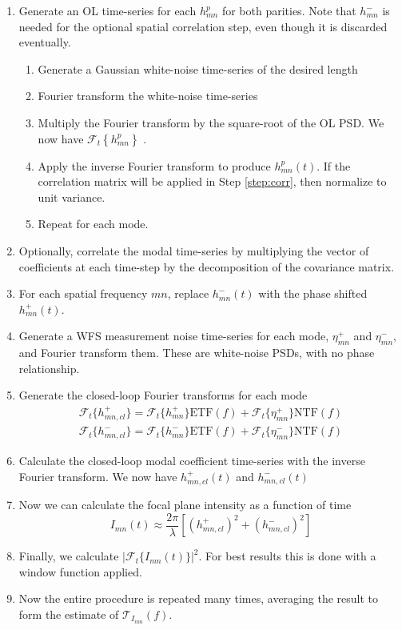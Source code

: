 \documentclass[10pt,preprint]{aastex631}
\begin{document}
\begin{enumerate}
\item Generate an OL time-series for each $h_{mn}^p$ for both parities.  Note that $h_{mn}^-$ is needed for the optional spatial correlation step, even though it is discarded eventually. \label{step:olh}
\begin{enumerate}
\item Generate a Gaussian white-noise time-series of the desired length
\item Fourier transform the white-noise time-series
\item Multiply the Fourier transform by the square-root of the OL PSD.  We now have $\mathcal{F}_t\left\{h_{mn}^p\right\}$ \citep[cf.][]{kasdin_falpha}.
\item Apply the inverse Fourier transform to produce $h_{mn}^p(t)$.  If the correlation matrix will be applied in Step \ref{step:corr}, then normalize to unit variance.
\item Repeat for each mode.
\end{enumerate}
\item Optionally, correlate the modal time-series by multiplying the vector of coefficients at each time-step by the decomposition of the covariance matrix. \label{step:corr}
\item For each spatial frequency $mn$, replace $h_{mn}^-(t)$ with the phase shifted $h_{mn}^+(t)$.
\item Generate a WFS measurement noise time-series for each mode, $\eta_{mn}^+$ and $\eta_{mn}^-$, and Fourier transform them.  These are white-noise PSDs, with no phase relationship.
\item Generate the closed-loop Fourier transforms for each mode \label{step:clh}
\begin{eqnarray}
\mathcal{F}_t\{h_{mn,cl}^+\} = \mathcal{F}_t\{h_{mn}^+\} \mathrm{ETF}(f) + \mathcal{F}_t\{\eta_{mn}^+\} \mathrm{NTF}(f) \\
\mathcal{F}_t\{h_{mn,cl}^-\} = \mathcal{F}_t\{h_{mn}^-\} \mathrm{ETF}(f) + \mathcal{F}_t\{\eta_{mn}^-\} \mathrm{NTF}(f) \nonumber
\end{eqnarray}
\item Calculate the closed-loop modal coefficient time-series with the inverse Fourier transform.  We now have $h_{mn,cl}^+(t)$ and $h_{mn,cl}^-(t)$ 
\item Now we can calculate the focal plane intensity as a function of time
\begin{equation}
I_{mn}(t) \approx \frac{2\pi}{\lambda}\left[ \left(h_{mn,cl}^+\right)^2 + \left(h_{mn,cl}^-\right)^2 \right] 
\end{equation}
\item Finally, we calculate $|\mathcal{F}_t\{I_{mn}(t)\}|^2$.  For best results this is done with a window function applied.
\item Now the entire procedure is repeated many times, averaging the result to form the estimate of $\mathcal{T}_{I_{mn}}(f)$.
\end{enumerate}
\end{document}

